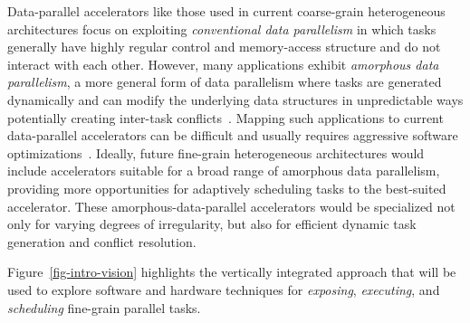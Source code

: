 Data-parallel accelerators like those used in current coarse-grain
heterogeneous architectures focus on exploiting \emph{conventional data
  parallelism} in which tasks generally have highly regular control and
memory-access structure and do not interact with each other. However,
many applications exhibit \emph{amorphous data parallelism}, a more
general form of data parallelism where tasks are generated dynamically
and can modify the underlying data structures in unpredictable ways
potentially creating inter-task conflicts~\cite{pingali-tao-pldi2011}.
Mapping such applications to current data-parallel accelerators can be
difficult and usually requires aggressive software
optimizations~\cite{luo-gpu-bfs-dac2010,harish-large-graph-gpu-hipc2007,
  hong-cuda-max-warp-ppopp2011,nasre-data-vs-topo-ipdps2013,
  nasre-morph-ppopp2013,mendez-optimizations-amorphous-ppopp2010,
  mendez-gpu-pta-ppopp2012}. Ideally, future fine-grain heterogeneous
architectures would include accelerators suitable for a broad range of
amorphous data parallelism, providing more opportunities for adaptively
scheduling tasks to the best-suited accelerator. These
amorphous-data-parallel accelerators would be specialized not only for
varying degrees of irregularity, but also for efficient dynamic task
generation and conflict resolution.

 Figure~\ref{fig-intro-vision} highlights
the vertically integrated approach that will be used to explore software
and hardware techniques for \emph{exposing}, \emph{executing}, and
\emph{scheduling} fine-grain parallel tasks.

